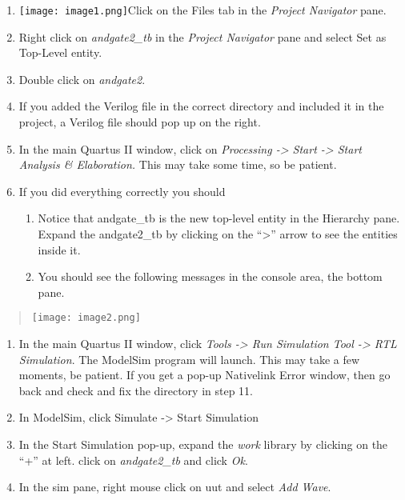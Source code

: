 \begin{enumerate}
  \begin{enumerate}
  \def\labelenumii{\alph{enumii}.}
  \item
    Select \emph{EDA Tool Options} from the Category menu,
  \item
    If the last row, ``ModelSim-Altera'' is blank, click on the \ldots{}
    button at right and navigate to the
    \emph{C:\textbackslash intelFPGA\_lite\textbackslash18.1\textbackslash modelsim\_ase\textbackslash{}},
    select the \emph{win32aloem} folder, the click Select Folder,
  \item
    Click Ok.
  \end{enumerate}
\item
  \texttt{[image: image1.png]}Click
  on the Files tab in the \emph{Project Navigator} pane.
\item
  Right click on \emph{andgate2\_tb} in the \emph{Project Navigator}
  pane and select Set as Top-Level entity.
\item
  Double click on \emph{andgate2}.
\item
  If you added the Verilog file in the correct directory and included it
  in the project, a Verilog file should pop up on the right.
\item
  In the main Quartus II window, click on \emph{Processing
  -\textgreater{} Start -\textgreater{} Start Analysis \& Elaboration.}
  This may take some time, so be patient.
\item
  If you did everything correctly you should

  \begin{enumerate}
  \def\labelenumii{\alph{enumii}.}
  \item
    Notice that andgate\_tb is the new top-level entity in the Hierarchy
    pane. Expand the andgate2\_tb by clicking on the ``\textgreater''
    arrow to see the entities inside it.
  \item
    You should see the following messages in the console area, the
    bottom pane.
  \end{enumerate}
\end{enumerate}

\begin{quote}
\texttt{[image: image2.png]}
\end{quote}

\begin{enumerate}
\def\labelenumi{\arabic{enumi}.}
\setcounter{enumi}{17}
\item
  In the main Quartus II window, click \emph{Tools -\textgreater{} Run
  Simulation Tool -\textgreater{} RTL Simulation}. The ModelSim program
  will launch. This may take a few moments, be patient. If you get a
  pop-up Nativelink Error window, then go back and check and fix the
  directory in step 11.
\item
  In ModelSim, click Simulate -\textgreater{} Start Simulation
\item
  In the Start Simulation pop-up, expand the \emph{work} library by
  clicking on the ``+'' at left. click on \emph{andgate2\_tb} and click
  \emph{Ok}.
\item
  In the sim pane, right mouse click on uut and select \emph{Add Wave}.
\end{enumerate}

